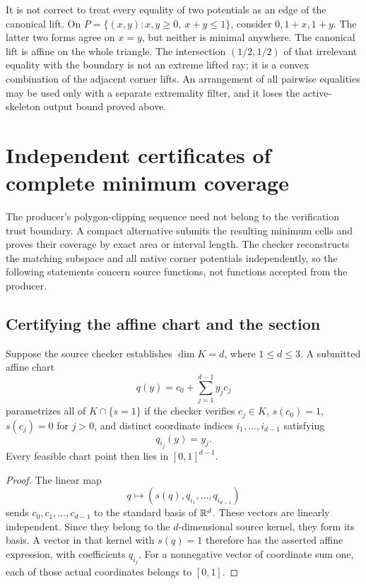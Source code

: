 \begin{remark}
\label{pl:inactive}
It is not correct to treat every equality of two potentials as
an edge of the canonical lift.
On \(P=\{(x,y):x,y\geq0,\ x+y\leq1\}\), consider
\(0,1+x,1+y\).  The latter two forms agree on \(x=y\), but
neither is minimal anywhere.  The canonical lift is affine on
the whole triangle.  The intersection \((1/2,1/2)\) of that
irrelevant equality with the boundary is not an extreme lifted
ray; it is a convex combination of the adjacent corner lifts.
An arrangement of all pairwise equalities may be used only with
a separate extremality filter, and it loses the active-skeleton
output bound proved above.
\end{remark}

\section{Independent certificates of complete minimum coverage}
\label{cv:coverage}

The producer's polygon-clipping sequence need not belong to the
verification trust boundary.  A compact alternative submits the
resulting minimum cells and proves their coverage by exact area
or interval length.  The checker reconstructs the matching
subspace and all native corner potentials independently, so the
following statements concern source functions, not functions
accepted from the producer.

\subsection{Certifying the affine chart and the section}
\label{cv:chart}

\begin{proposition}
\label{cv:chart-completeness}
Suppose the source checker establishes \(\dim K=d\), where
\(1\leq d\leq3\).  A submitted affine chart
\[
 q(y)=c_0+\sum_{j=1}^{d-1}y_jc_j
\]
parametrizes all of \(K\cap\{s=1\}\) if the checker verifies
\(c_j\in K\), \(s(c_0)=1\), \(s(c_j)=0\) for \(j>0\),
and distinct coordinate indices \(i_1,\ldots,i_{d-1}\) satisfying
\[
 q_{i_j}(y)=y_j.
\]
Every feasible chart point then lies in \([0,1]^{d-1}\).
\end{proposition}
\begin{proof}
The linear map
\[
 q\longmapsto(s(q),q_{i_1},\ldots,q_{i_{d-1}})
\]
sends \(c_0,c_1,\ldots,c_{d-1}\) to the standard basis of
\(\mathbb{R}^d\).  These vectors are linearly independent.
Since they belong to the \(d\)-dimensional source kernel, they
form its basis.  A vector in that kernel with \(s(q)=1\)
therefore has the asserted affine expression, with coefficients
\(q_{i_j}\).  For a nonnegative vector of coordinate sum one,
each of those actual coordinates belongs to \([0,1]\).
\end{proof}

